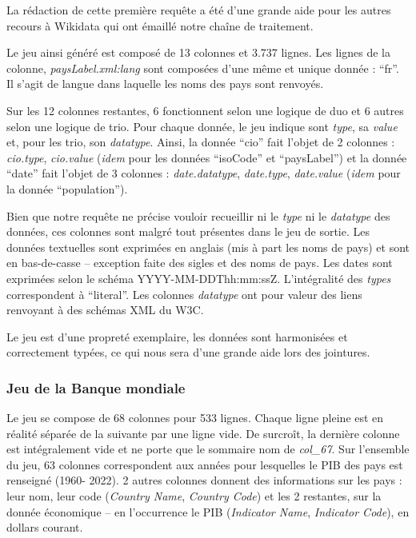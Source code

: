 \documentclass[hidelinks, 12pt]{article}
\begin{document}
La rédaction de cette première requête a été d'une grande aide pour les autres recours à Wikidata qui ont émaillé notre chaîne de traitement.
\newline

Le jeu ainsi généré est composé de 13 colonnes et 3.737 lignes. Les lignes de la colonne, \textit{paysLabel.xml:lang} sont composées d'une même et unique donnée : \enquote{fr}. Il s'agit de langue dans laquelle les noms des pays sont renvoyés. 

\label{query1tab}Sur les 12 colonnes restantes, 6 fonctionnent selon une logique de duo et 6 autres selon une logique de trio. Pour chaque donnée, le jeu indique sont \textit{type}, sa \textit{value} et, pour les trio, son \textit{datatype}. Ainsi, la donnée \enquote{cio} fait l'objet de 2 colonnes : \textit{cio.type}, \textit{cio.value} (\textit{idem} pour les données \enquote{isoCode} et \enquote{paysLabel}) et la donnée \enquote{date} fait l'objet de 3 colonnes : \textit{date.datatype}, \textit{date.type}, \textit{date.value} (\textit{idem} pour la donnée \enquote{population}). 

Bien que notre requête ne précise vouloir recueillir ni le \textit{type} ni le \textit{datatype} des données, ces colonnes sont malgré tout présentes dans le jeu de sortie. Les données textuelles sont exprimées en anglais (mis à part les noms de pays) et sont en bas-de-casse -- exception faite des sigles et des noms de pays. Les dates sont exprimées selon le schéma YYYY-MM-DDThh\!\!:mm\!\!:ssZ. L'intégralité des \textit{types} correspondent à \enquote{literal}. Les colonnes \textit{datatype} ont pour valeur des liens renvoyant à des schémas XML du W3C.

Le jeu est d'une propreté exemplaire, les données sont harmonisées et correctement typées, ce qui nous sera d'une grande aide lors des jointures.





%





\subsubsection{Jeu de la Banque mondiale}

Le jeu se compose de 68 colonnes pour 533 lignes. Chaque ligne pleine est en réalité séparée de la suivante par une ligne vide. De surcroît, la dernière colonne est intégralement vide et ne porte que le sommaire nom de \textit{col\_67}. Sur l'ensemble du jeu, 63 colonnes correspondent aux années pour lesquelles le PIB des pays est renseigné (1960- 2022). 2 autres colonnes donnent des informations sur les pays : leur nom, leur code (\textit{Country Name}, \textit{Country Code}) et les 2 restantes, sur la donnée économique -- en l'occurrence le PIB (\textit{Indicator Name}, \textit{Indicator Code}), en dollars courant. 
\end{document}
